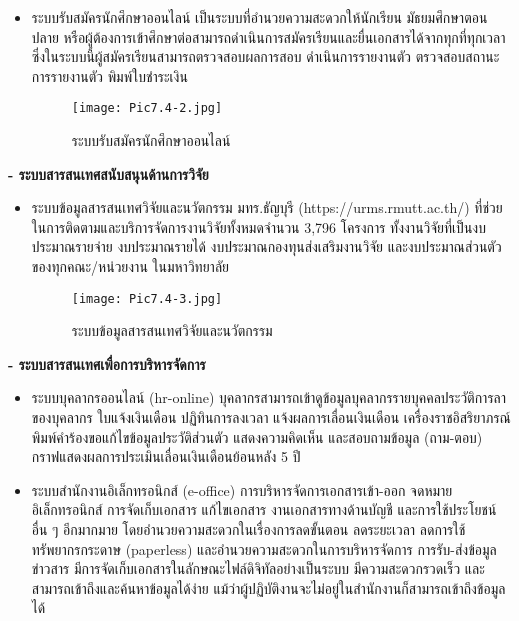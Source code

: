 \begin{enumerate}
\begin{itemize}
\item ระบบรับสมัครนักศึกษาออนไลน์ เป็นระบบที่อำนวยความสะดวกให้นักเรียน มัธยมศึกษาตอนปลาย หรือผู้ต้องการเข้าศึกษาต่อสามารถดำเนินการสมัครเรียนและยื่นเอกสารได้จากทุกที่ทุกเวลา ซึ่งในระบบนี้ผู้สมัครเรียนสามารถตรวจสอบผลการสอบ ดำเนินการรายงานตัว ตรวจสอบสถานะการรายงานตัว พิมพ์ใบชำระเงิน
	 \begin{figure}[H]
	\begin{center}
		\hspace*{1.5cm}
		\texttt{[image: Pic7.4-2.jpg]}\\
		\caption{ระบบรับสมัครนักศึกษาออนไลน์}
	\end{center}
\end{figure}
\end{itemize}
\textbf{- ระบบสารสนเทศสนับสนุนด้านการวิจัย}
\begin{itemize}
\item ระบบข้อมูลสารสนเทศวิจัยและนวัตกรรม มทร.ธัญบุรี (https://urms.rmutt.ac.th/) ที่ช่วยในการติดตามและบริการจัดการงานวิจัยทั้งหมดจำนวน  3,796 โครงการ ทั้งงานวิจัยที่เป็นงบประมาณรายจ่าย งบประมาณรายได้ งบประมาณกองทุนส่งเสริมงานวิจัย และงบประมาณส่วนตัว ของทุกคณะ/หน่วยงาน ในมหาวิทยาลัย
	 \begin{figure}[H]
	\begin{center}
		\hspace*{1.5cm}
		\texttt{[image: Pic7.4-3.jpg]}\\
\caption{ระบบข้อมูลสารสนเทศวิจัยและนวัตกรรม}
	\end{center}
\end{figure}
\end{itemize}
\textbf{- ระบบสารสนเทศเพื่อการบริหารจัดการ}
\begin{itemize}
	\item ระบบบุคลากรออนไลน์ (hr-online) 
	บุคลากรสามารถเข้าดูข้อมูลบุคลากรรายบุคคลประวัติการลาของบุคลากร ใบแจ้งเงินเดือน ปฏิทินการลงเวลา แจ้งผลการเลื่อนเงินเดือน เครื่องราชอิสริยาภรณ์ พิมพ์คำร้องขอแก้ไขข้อมูลประวัติส่วนตัว แสดงความคิดเห็น และสอบถามข้อมูล (ถาม-ตอบ) กราฟแสดงผลการประเมินเลื่อนเงินเดือนย้อนหลัง 5 ปี
	\item ระบบสำนักงานอิเล็กทรอนิกส์ (e-office) การบริหารจัดการเอกสารเข้า-ออก จดหมาย
	อิเล็กทรอนิกส์ การจัดเก็บเอกสาร แก้ไขเอกสาร งานเอกสารทางด้านบัญชี และการใช้ประโยชน์อื่น ๆ อีกมากมาย โดยอำนวยความสะดวกในเรื่องการลดขั้นตอน ลดระยะเวลา ลดการใช้ทรัพยากรกระดาษ (paperless) และอำนวยความสะดวกในการบริหารจัดการ การรับ-ส่งข้อมูลข่าวสาร มีการจัดเก็บเอกสารในลักษณะไฟล์ดิจิทัลอย่างเป็นระบบ มีความสะดวกรวดเร็ว และสามารถเข้าถึงและค้นหาข้อมูลได้ง่าย แม้ว่าผู้ปฏิบัติงานจะไม่อยู่ในสำนักงานก็สามารถเข้าถึงข้อมูลได้

\end{itemize}
\end{enumerate}
